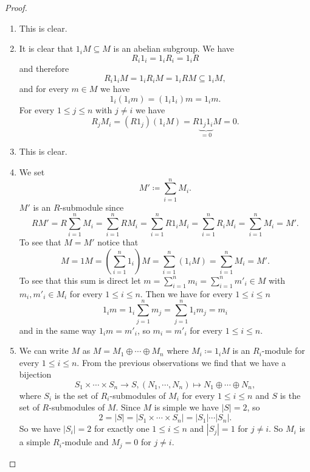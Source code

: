 \begin{proof}
  \begin{enumerate}[label=\emph{\alph*)},leftmargin=*]
    \item
      This is clear.
    \item
      It is clear that $1_i M \subseteq M$ is an abelian subgroup. We have
      \[
        R_i 1_i = 1_i R_i = 1_i R
      \]
      and therefore
      \[
        R_i 1_i M = 1_i R_i M = 1_i R M \subseteq 1_i M,
      \]
      and for every $m \in M$ we have
      \[
        1_i (1_i m) = (1_i 1_i) m = 1_i m.
      \]
      For every $1 \leq j \leq n$ with $j \neq i$ we have
      \[
        R_j M_i = (R 1_j) (1_i M) = R \underbrace{1_j 1_i}_{=0} M = 0.
      \]
    \item
      This is clear.
    \item
      We set
      \[
        M' \coloneqq \sum_{i=1}^n M_i.
      \]
      $M'$ is an $R$-submodule since
      \[
        R M'
        = R \sum_{i=1}^n M_i
        = \sum_{i=1}^n R M_i
        = \sum_{i=1}^n R 1_i M_i
        = \sum_{i=1}^n R_i M_i
        = \sum_{i=1}^n M_i
        = M'.
      \]
      To see that $M = M'$ notice that
      \[
        M
        = 1 M
        = \left( \sum_{i=1}^n 1_i \right) M
        = \sum_{i=1}^n (1_i M)
        = \sum_{i=1}^n M_i
        = M'.
      \]
      To see that this sum is direct let $m = \sum_{i=1}^n m_i = \sum_{i=1}^n m'_i \in M$ with $m_i, m'_i \in M_i$ for every $1 \leq i \leq n$. Then we have for every $1 \leq i \leq n$
      \[
        1_i m
        = 1_i \sum_{j=1}^n m_j
        = \sum_{j=1}^n 1_i m_j
        = m_i
      \]
      and in the same way $1_i m = m'_i$, so $m_i = m'_i$ for every $1 \leq i \leq n$.
    \item
      We can write $M$ as $M = M_1 \oplus \dotsb \oplus M_n$ where $M_i \coloneqq 1_i M$ is an $R_i$-module for every $1 \leq i \leq n$. From the previous observations we find that we have a bijection
      \[
        S_1 \times \dotsb \times S_n \to S, (N_1, \dotsb, N_n) \mapsto N_1 \oplus \dotsb \oplus N_n,
      \]
      where $S_i$ is the set of $R_i$-submodules of $M_i$ for every $1 \leq i \leq n$ and $S$ is the set of $R$-submodules of $M$. Since $M$ is simple we have $|S| = 2$, so
      \[
        2 = |S| = |S_1 \times \dotsb \times S_n| = |S_1| \dotsm |S_n|.
      \]
      So we have $|S_i| = 2$ for exactly one $1 \leq i \leq n$ and $|S_j| = 1$ for $j \neq i$. So $M_i$ is a simple $R_i$-module and $M_j = 0$ for $j \neq i$.
    \qedhere
  \end{enumerate}
\end{proof}


